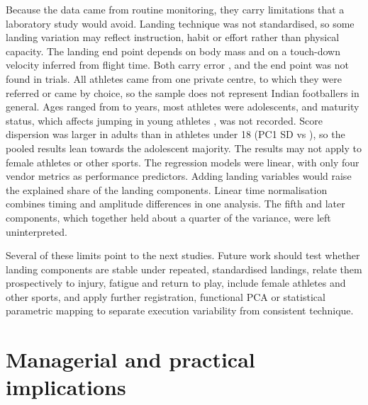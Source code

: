 Because the data came from routine monitoring, they carry limitations that a laboratory study would avoid. Landing technique was not standardised, so some landing variation may reflect instruction, habit or effort rather than physical capacity. The landing end point depends on body mass and on a touch-down velocity inferred from flight time. Both carry error \parencite{street2001}, and the end point was not found in \nLowcomMissing{} trials. All athletes came from one private centre, to which they were referred or came by choice, so the sample does not represent Indian footballers in general. Ages ranged from \ageMin{} to \ageMax{} years, most athletes were adolescents, and maturity status, which affects jumping in young athletes \parencite{malina2015,lloyd2012}, was not recorded. Score dispersion was larger in adults than in athletes under 18 (PC1 SD \sdAdultPCA{} vs \sdMinorPCA), so the pooled results lean towards the adolescent majority. The results may not apply to female athletes or other sports. The regression models were linear, with only four vendor metrics as performance predictors. Adding landing variables would raise the explained share of the landing components. Linear time normalisation combines timing and amplitude differences in one analysis. The fifth and later components, which together held about a quarter of the variance, were left uninterpreted.

Several of these limits point to the next studies. Future work should test whether landing components are stable under repeated, standardised landings, relate them prospectively to injury, fatigue and return to play, include female athletes and other sports, and apply further registration, functional PCA \parencite{ramsay2005,warmenhoven2019} or statistical parametric mapping \parencite{pataky2013} to separate execution variability from consistent technique.

\section{Managerial and practical implications}
\label{sec:implications}

